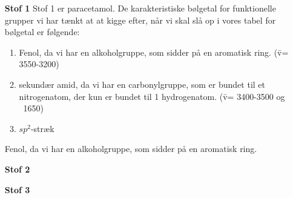 \begin{enumerate}
\item[\textbf{Stof 1}] 
Stof 1 er paracetamol. De karakteristiske bølgetal for funktionelle grupper vi har tænkt at at kigge efter, når vi skal slå op i vores tabel for bølgetal er følgende: 
\begin{enumerate}
\item Fenol, da vi har en alkoholgruppe, som sidder på en aromatisk ring. (\={v}= 3550-3200) 

\item sekundær amid, da vi har en carbonylgruppe, som er bundet til et nitrogenatom, der kun er bundet til 1 hydrogenatom. (\={v}= 3400-3500 og ~1650)

\item $sp^2$-stræk 
\end{enumerate}

Fenol, da vi har en alkoholgruppe, som sidder på en aromatisk ring. 
\item[\textbf{Stof 2}]

\item[\textbf{Stof 3}]

\end{enumerate}